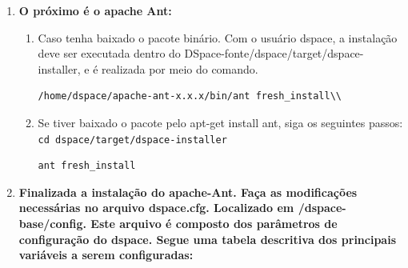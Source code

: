 \documentclass[12pt,hidelinks]{article}
\begin{document}
\begin{enumerate}
\begin{enumerate}
            \end{enumerate}
            
        \item \textbf{O próximo é o apache Ant:}\\
        
         \begin{enumerate}
            \item Caso tenha baixado o pacote binário. Com o usuário dspace, a instalação deve ser executada dentro do DSpace-fonte/dspace/target/dspace-installer, e é realizada por meio do comando.\\
            
                \begin{verbatim}
/home/dspace/apache-ant-x.x.x/bin/ant fresh_install\\
            \end{verbatim}
            
            \item Se tiver baixado o pacote pelo apt-get install ant, siga os seguintes passos:\\
            
            \texttt{cd dspace/target/dspace-installer}\\
            
            \begin{verbatim}
ant fresh_install
            \end{verbatim}

            \end{enumerate}
            
        \item \textbf{Finalizada a instalação do apache-Ant. Faça as modificações necessárias no arquivo dspace.cfg. Localizado em /dspace-base/config. Este arquivo é composto dos parâmetros de configuração do dspace. Segue uma tabela descritiva dos principais variáveis a serem configuradas:}
            

\end{enumerate}
\end{document}
